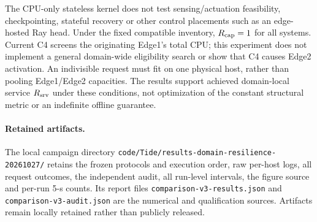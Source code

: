 The CPU-only stateless kernel does not test sensing/actuation feasibility, checkpointing, stateful recovery or other control placements such as an edge-hosted Ray head. Under the fixed compatible inventory, $R_{\rm cap}=1$ for all systems. Current C4 screens the originating Edge1's total CPU; this experiment does not implement a general domain-wide eligibility search or show that C4 causes Edge2 activation. An indivisible request must fit on one physical host, rather than pooling Edge1/Edge2 capacities. The results support achieved domain-local service $R_{\rm srv}$ under these conditions, not optimization of the constant structural metric or an indefinite offline guarantee.

\paragraph{Retained artifacts.}
The local campaign directory \texttt{code/Tide/results-domain-resilience-20261027/} retains the frozen protocols and execution order, raw per-host logs, all request outcomes, the independent audit, all run-level intervals, the figure source and per-run 5-s counts. Its report files \texttt{comparison-v3-results.json} and \texttt{comparison-v3-audit.json} are the numerical and qualification sources. Artifacts remain locally retained rather than publicly released.
